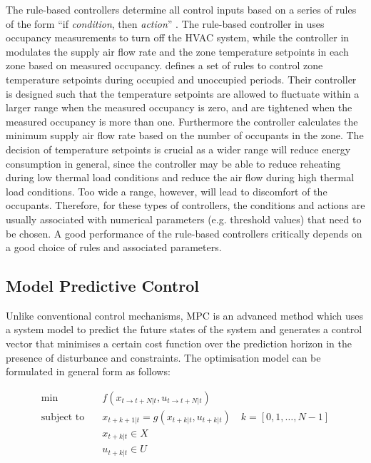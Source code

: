 The rule-based controllers determine all control inputs based on a series of rules of the form ``if \textsl{condition}, then \textsl{action}'' \citep{dhummi2011robust,agarwal2011duty,goyal2012zone,goyal2013occupancy}. The rule-based controller in \cite{agarwal2011duty} uses occupancy measurements to turn off the HVAC system, while the controller in \cite{dhummi2011robust} modulates the supply air flow rate and the zone temperature setpoints in each zone based on measured occupancy. \cite{goyal2013occupancy} defines a set of rules to control zone temperature setpoints during occupied and unoccupied periods. Their controller is designed such that the temperature setpoints are allowed to fluctuate within a larger range when the measured occupancy is zero, and are tightened when the measured occupancy is more than one. Furthermore the controller calculates the minimum supply air flow rate based on the number of occupants in the zone. The decision of temperature setpoints is crucial as a wider range will reduce energy consumption in general, since the controller may be able to reduce reheating during low thermal load conditions and reduce the air flow during high thermal load conditions. Too wide a range, however, will lead to discomfort of the occupants. Therefore, for these types of controllers, the conditions and actions are usually associated with numerical parameters (e.g. threshold values) that need to be chosen. A good performance of the rule-based controllers critically depends on a good choice of rules and associated parameters. 

\subsection{Model Predictive Control}

Unlike conventional control mechanisms, MPC is an advanced method which uses a system model to predict the future states of the system and generates a control vector that minimises a certain cost function over the prediction horizon in the presence of disturbance and constraints. 
The optimisation model can be formulated in general form as follows:

\begingroup
\begin{align*}
\min \quad &f\left(x_{t\rightarrow t+N|t}, u_{t\rightarrow t+N|t}\right) \\
\mbox{subject to} \quad &x_{t+k+1|t} = g\left(x_{t+k|t}, u_{t+k|t}\right) \quad k=\left[0, 1,\ldots, N-1\right] \\
&x_{t+k|t} \in X \\
&u_{t+k|t} \in U \\
\end{align*}
\endgroup

